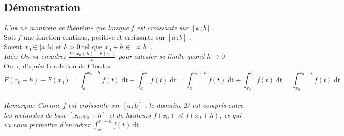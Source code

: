 \documentclass[12px]{article}
\newcommand\I{$[a\,;b]$ }
\newcommand\dt{f(t)\;\mathrm{dt}}
\begin{document}
	\subsection{Démonstration}
	\emph{L'on ne montrera ce théorème que lorsque $f$ est croissante sur \I}.\\
	
	Soit $f$ une fonction continue, positive et croissante sur \I.\\
	Soient $x_0\in\I$ et $h>0$ tel que $x_0+h \in [a;b]$.\\
	
	\emph{Idée: On va encadrer $\frac{F( x_0 +h) - F(x_0) }{h}$ pour calculer sa limite quand $h \rightarrow 0$}\\
		
	On a, d'après la relation de Chasles:\\
	\begin{displaymath}
		F( x_0 +h ) - F(x_0) = \int_{a}^{x_0 +h}\dt - \int_{a}^{x_0}\dt = 
		\int_{a}^{ x_0 +h }\dt + \int_{x_0}^{a}\dt = \int_{x_0}^{x_0 +h}\dt
	\end{displaymath}
	\\
		
	\emph{
	Remarque: Comme $f$ est croissante sur \I, le domaine $\mathcal{D}$ est compris entre les rectangles de base $[x_0; x_0 +h]$ et de hauteurs $f(x_0)$ et $f(x_0 +h)$, ce qui va nous permettre d'encadrer $\int_{x_0}^{x_0 +h}\dt$.}\\
	
\end{document}
